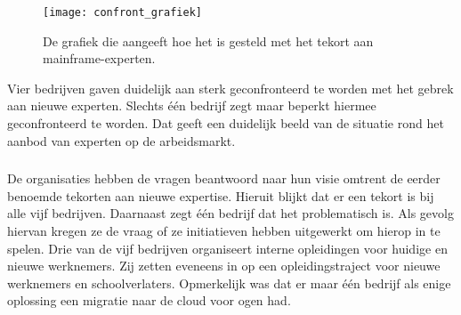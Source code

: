  \begin{figure}[h]
     \centering
     \texttt{[image: confront\_grafiek]}
     \caption{De grafiek die aangeeft hoe het is gesteld met het tekort aan mainframe-experten.}
     \label{fig: expertisetekort}
 \end{figure}

Vier bedrijven gaven duidelijk aan sterk geconfronteerd te worden met het gebrek aan nieuwe experten. Slechts één bedrijf zegt maar beperkt hiermee geconfronteerd te worden. Dat geeft een duidelijk beeld van de situatie rond het aanbod van experten op de arbeidsmarkt.

 \subsubsection{}
\label{sec:Wat is de visie van de bevraagde bedrijven rond expertise en welke initiatieve zetten ze hiervoor op?}

De organisaties hebben de vragen beantwoord naar hun visie omtrent de eerder benoemde tekorten aan nieuwe expertise. Hieruit blijkt dat er een tekort is bij alle vijf bedrijven. Daarnaast zegt één bedrijf dat het problematisch is. Als gevolg hiervan kregen ze de vraag of ze initiatieven hebben uitgewerkt om hierop in te spelen. Drie van de vijf bedrijven organiseert interne opleidingen voor huidige en nieuwe werknemers. Zij zetten eveneens in op een opleidingstraject voor nieuwe werknemers en schoolverlaters. Opmerkelijk was dat er maar één bedrijf als enige oplossing een migratie naar de cloud voor ogen had. 

\newpage

\subsubsection{}
\label{sec:Welke nadelen brengt het gebruik van een mainframe mee voor de organisatie?}


